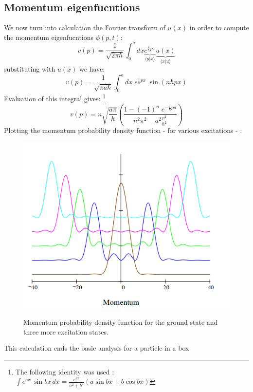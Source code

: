 \subsection{Momentum eigenfucntions}
We now turn into calculation the Fourier transform of $ u(x)$ in order to compute the momentum eigenfucntions $ \phi(p,t) $:
\begin{equation}
v(p) = \frac{1}{\sqrt{2 \pi \hbar}} \int_0 ^ a  dx \underbrace{ e^{\frac{i}{\hbar} px}}_{\langle p| x\rangle} \underbrace{u(x)}_{\langle x| u\rangle}
\end{equation}
substituting with $ u(x)$ we have:
\begin{equation}
v(p) =  \frac{1}{\sqrt{ \pi a \hbar}} \int_0 ^ a  dx \;  e^{\frac{i}{\hbar} px} \; \sin ( n \hbar p x )
\end{equation}
Evaluation of this integral gives: \footnote{ The following identity was used : \\ $ \int e^{ax}\, \sin bx\, dx = \frac{ e^{ax}}{a^2 +b^2}\left( a \sin bx + b \cos bx\right) $}
\begin{equation}
v(p) = n \sqrt{\frac{a \pi}{\hbar}}\left( \frac{1-(-1)^n \; e^{-\frac{i}{\hbar}p a}}{n^2 \pi^2 - a^2 \frac{p^2}{\hbar ^2}} \right) 
\end{equation}
Plotting the momentum probability density function  - for various excitations - :
\begin{figure}[h!]
	\centering
	\includegraphics[scale =0.5]{./figures/mom}
	\label{m}
	\caption{ Momentum probability density function for the ground state and three more excitation states.}
\end{figure}
This calculation ends the basic analysis for a particle in a box.
